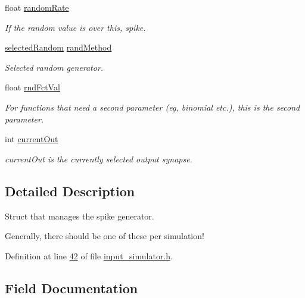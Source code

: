 \begin{DoxyCompactItemize}
float \hyperlink{structinput_simulator_state_a1333eb5695ae83d1ffccf24b08bc6288}{random\+Rate}
\begin{DoxyCompactList}\small\item\em If the random value is over this, spike. \end{DoxyCompactList}\item 
\hyperlink{input__simulator_8h_aa0d25534cd73156287b1136dd89c0215}{selected\+Random} \hyperlink{structinput_simulator_state_a18766f12fc4212349fb61b221f83b779}{rand\+Method}
\begin{DoxyCompactList}\small\item\em Selected random generator. \end{DoxyCompactList}\item 
float \hyperlink{structinput_simulator_state_a0eb8199754a403ccc8eac256f9193a02}{rnd\+Fct\+Val}
\begin{DoxyCompactList}\small\item\em For functions that need a second parameter (eg, binomial etc.), this is the second parameter. \end{DoxyCompactList}\item 
int \hyperlink{structinput_simulator_state_accc0c3f890194cda401a16f5f54e43cb}{current\+Out}
\begin{DoxyCompactList}\small\item\em current\+Out is the currently selected output synapse. \end{DoxyCompactList}\end{DoxyCompactItemize}


\subsection{Detailed Description}
Struct that manages the spike generator. 

Generally, there should be one of these per simulation! 

Definition at line \hyperlink{input__simulator_8h_source_l00042}{42} of file \hyperlink{input__simulator_8h_source}{input\+\_\+simulator.\+h}.



\subsection{Field Documentation}
\hypertarget{structinput_simulator_state_a569dc67b8984bb0a3616bf17f9763ebb}{}
